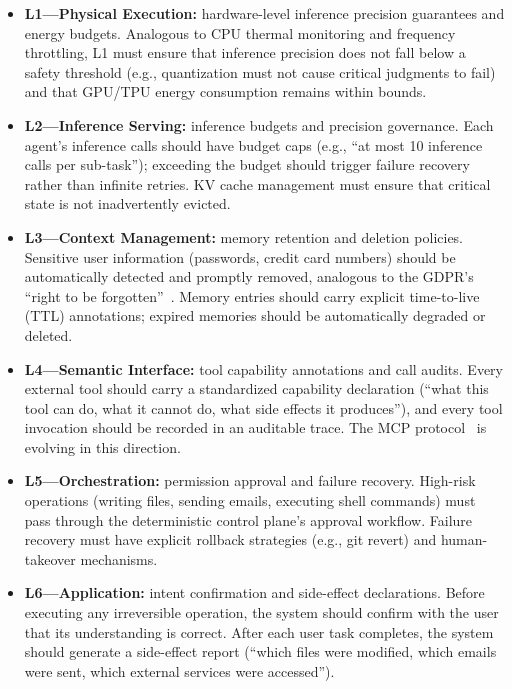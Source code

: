 \documentclass[11pt,a4paper]{article}
\begin{document}
\begin{itemize}[nosep]
\item \textbf{L1---Physical Execution:} hardware-level inference precision guarantees and energy budgets.
Analogous to CPU thermal monitoring and frequency throttling, L1 must ensure that inference precision does not fall below a safety threshold (e.g., quantization must not cause critical judgments to fail) and that GPU/TPU energy consumption remains within bounds.

\item \textbf{L2---Inference Serving:} inference budgets and precision governance.
Each agent's inference calls should have budget caps (e.g., ``at most 10 inference calls per sub-task''); exceeding the budget should trigger failure recovery rather than infinite retries.
KV cache management must ensure that critical state is not inadvertently evicted.

\item \textbf{L3---Context Management:} memory retention and deletion policies.
Sensitive user information (passwords, credit card numbers) should be automatically detected and promptly removed, analogous to the GDPR's ``right to be forgotten''~\cite{gdpr_righttoforget}.
Memory entries should carry explicit time-to-live (TTL) annotations; expired memories should be automatically degraded or deleted.

\item \textbf{L4---Semantic Interface:} tool capability annotations and call audits.
Every external tool should carry a standardized capability declaration (``what this tool can do, what it cannot do, what side effects it produces''), and every tool invocation should be recorded in an auditable trace.
The MCP protocol~\cite{mcp_intro_2026} is evolving in this direction.

\item \textbf{L5---Orchestration:} permission approval and failure recovery.
High-risk operations (writing files, sending emails, executing shell commands) must pass through the deterministic control plane's approval workflow.
Failure recovery must have explicit rollback strategies (e.g., git revert) and human-takeover mechanisms.

\item \textbf{L6---Application:} intent confirmation and side-effect declarations.
Before executing any irreversible operation, the system should confirm with the user that its understanding is correct.
After each user task completes, the system should generate a side-effect report (``which files were modified, which emails were sent, which external services were accessed'').
\end{itemize}
\end{document}
